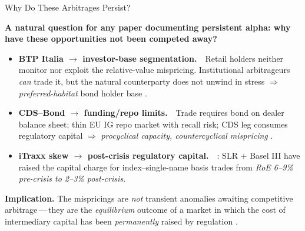 \documentclass[aspectratio=169,11pt]{beamer}
\newcommand{\hlt}[1]{\textcolor{edhecred}{\textbf{#1}}}     %
\newcommand{\hltb}[1]{\textcolor{accentblue}{\textbf{#1}}}  %
\begin{document}
\begin{frame}[t]{Why Do These Arbitrages Persist?}
\small

\textbf{A natural question for any paper documenting persistent alpha:
why have these opportunities not been competed away?}

\vspace{0.25cm}

\begin{itemize}\itemsep=0.20cm

  \item \hlt{BTP Italia $\to$ investor-base segmentation.}\ \  Retail holders neither monitor nor
        exploit the relative-value mispricing. Institutional arbitrageurs \emph{can} trade it, but
        the natural counterparty does not unwind in stress
        $\Rightarrow$ \emph{preferred-habitat} bond holder base \citep{vayanos2021preferred}.

  \item \hlt{CDS--Bond $\to$ funding/repo limits.}\ \ Trade requires bond on dealer balance sheet;
        thin EU IG repo market with recall risk; CDS leg consumes regulatory capital
        $\Rightarrow$ \emph{procyclical capacity, countercyclical mispricing}
        \citep{bai2019cds, mitchell2012arbitrage}.

  \item \hlt{iTraxx skew $\to$ post-crisis regulatory capital.}\ \  \citet{boyarchenko2016trends}:
        SLR + Basel III have raised the capital charge for index--single-name basis trades from
        \emph{RoE 6--9\% pre-crisis to 2--3\% post-crisis}.

\end{itemize}

\vspace{0.30cm}

\hltb{Implication.} The mispricings are \emph{not} transient anomalies awaiting competitive
arbitrage\,---\,they are the \emph{equilibrium} outcome of a market in which the cost of intermediary
capital has been \emph{permanently} raised by regulation \citep{mitchell2007slow}.

\end{frame}

\end{document}
